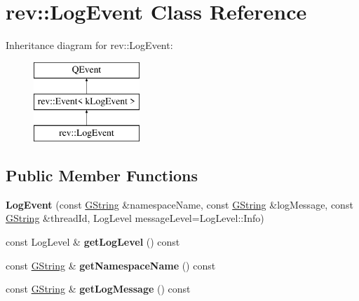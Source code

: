 \hypertarget{classrev_1_1_log_event}{}\section{rev\+::Log\+Event Class Reference}
\label{classrev_1_1_log_event}
Inheritance diagram for rev\+::Log\+Event\+:\begin{figure}[H]
\begin{center}
\leavevmode
\includegraphics[height=3.000000cm]{classrev_1_1_log_event}
\end{center}
\end{figure}
\subsection*{Public Member Functions}
\begin{DoxyCompactItemize}
\item 
\mbox{\label{classrev_1_1_log_event_af87a710dd45694c717f7af1f610e865a}} 
{\bfseries Log\+Event} (const \mbox{\hyperlink{classrev_1_1_g_string}{G\+String}} \&namespace\+Name, const \mbox{\hyperlink{classrev_1_1_g_string}{G\+String}} \&log\+Message, const \mbox{\hyperlink{classrev_1_1_g_string}{G\+String}} \&thread\+Id, Log\+Level message\+Level=Log\+Level\+::\+Info)
\item 
\mbox{\label{classrev_1_1_log_event_af50bf9194dfc9c936bb789279d8d18a8}} 
const Log\+Level \& {\bfseries get\+Log\+Level} () const
\item 
\mbox{\label{classrev_1_1_log_event_a1ba6c412ef9b2bb9f9edf09e585652fe}} 
const \mbox{\hyperlink{classrev_1_1_g_string}{G\+String}} \& {\bfseries get\+Namespace\+Name} () const
\item 
\mbox{\label{classrev_1_1_log_event_a20148c8cc0ae8b5f1b145ce3e20298d1}} 
const \mbox{\hyperlink{classrev_1_1_g_string}{G\+String}} \& {\bfseries get\+Log\+Message} () const
\end{DoxyCompactItemize}

